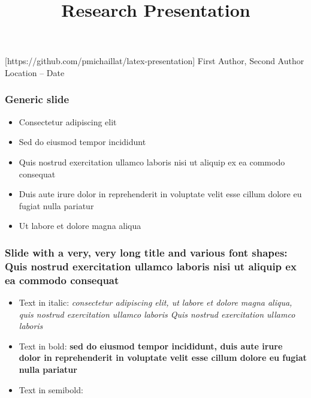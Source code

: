 \documentclass[11pt,xcolor={dvipsnames},hyperref={pdftex,pdfpagemode=UseNone,hidelinks,pdfdisplaydoctitle=true},usepdftitle=false]{beamer}
\begin{document}
\title{Research Presentation}

\information
%
[https://github.com/pmichaillat/latex-presentation]
%
{First Author, Second Author}
%
{Location -- Date}

\frame{\titlepage}

\begin{frame}
\frametitle{Generic slide}
\begin{itemize}
\item Consectetur adipiscing elit
\item Sed do eiusmod tempor incididunt
\item Quis nostrud exercitation ullamco laboris nisi ut aliquip ex ea commodo consequat
\item Duis aute irure dolor in reprehenderit in voluptate velit esse cillum dolore eu fugiat nulla pariatur
\item Ut labore et dolore magna aliqua
\end{itemize}
\end{frame}

\begin{frame}
\frametitle{Slide with a very, very long title and various font shapes: Quis nostrud exercitation ullamco laboris nisi ut aliquip ex ea commodo consequat}
\begin{itemize}
\item Text in italic: \textit{consectetur adipiscing elit, ut labore et dolore magna aliqua, quis nostrud exercitation ullamco laboris Quis nostrud exercitation ullamco laboris}
\item Text in bold: \textbf{sed do eiusmod tempor incididunt, duis aute irure dolor in reprehenderit in voluptate velit esse cillum dolore eu fugiat nulla pariatur}
\item Text in semibold: 
\end{itemize}
\end{frame}
\end{document}
